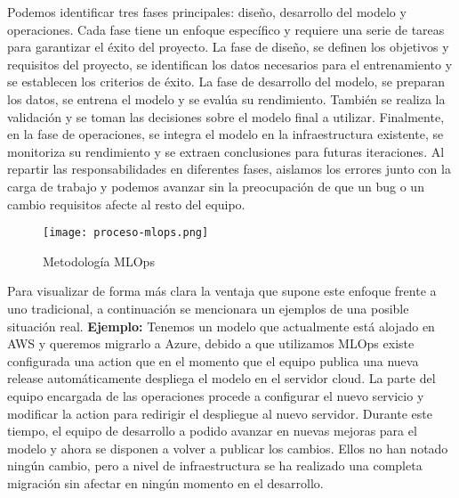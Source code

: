 Podemos identificar tres fases principales: diseño, desarrollo del modelo y operaciones. Cada fase tiene un enfoque
específico y requiere una serie de tareas para garantizar el éxito del proyecto. La fase de diseño,
se definen los objetivos y requisitos del proyecto, se identifican los datos necesarios para el entrenamiento y
se establecen los criterios de éxito. La fase de desarrollo del modelo, se preparan los datos, se entrena el modelo
y se evalúa su rendimiento. También se realiza la validación y se toman las decisiones sobre el modelo final a utilizar.
Finalmente, en la fase de operaciones, se integra el modelo en la infraestructura existente, se monitoriza su rendimiento
y se extraen conclusiones para futuras iteraciones. Al repartir las responsabilidades en diferentes fases, aislamos los 
errores junto con la carga de trabajo y podemos avanzar sin la preocupación de que un bug o un cambio requisitos 
afecte al resto del equipo.

\begin{figure}[ht]
    \centering
    \texttt{[image: proceso-mlops.png]}
    \caption{Metodología MLOps}
    \label{fig:proces-mlops}
\end{figure}

Para visualizar de forma más clara la ventaja que supone este enfoque frente a uno tradicional, a continuación
se mencionara un ejemplos de una posible situación real. \textbf{Ejemplo:} Tenemos un modelo que actualmente está alojado en AWS y queremos migrarlo a Azure, debido a que
utilizamos MLOps existe configurada una action que en el momento que el equipo publica una nueva release
automáticamente despliega el modelo en el servidor cloud. La parte del equipo encargada de las operaciones procede
a configurar el nuevo servicio y modificar la action para redirigir el despliegue al nuevo servidor. Durante este
tiempo, el equipo de desarrollo a podido avanzar en nuevas mejoras para el modelo y ahora se disponen a volver
a publicar los cambios. Ellos no han notado ningún cambio, pero a nivel de infraestructura se ha realizado una
completa migración sin afectar en ningún momento en el desarrollo.


\pagebreak